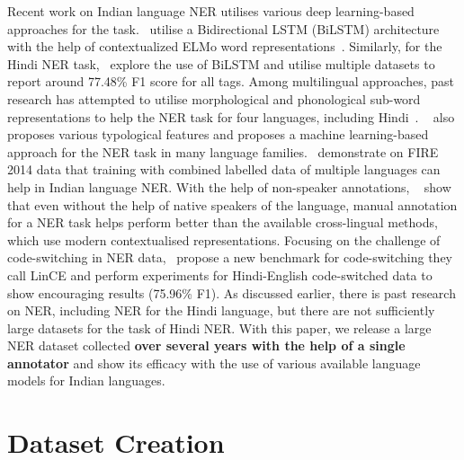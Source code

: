 \documentclass[10pt, a4paper]{article}
\begin{document}
Recent work on Indian language NER utilises various deep learning-based approaches for the task.~ utilise a Bidirectional LSTM (BiLSTM) architecture with the help of contextualized ELMo word representations~\cite{peters-etal-2018-deep}. Similarly, for the Hindi NER task,~ explore the use of BiLSTM and utilise multiple datasets to report around 77.48\% F1 score for all tags. Among multilingual approaches, past research has attempted to utilise morphological and phonological sub-word representations to help the NER task for four languages, including Hindi~\cite{chaudhary2018adapting}. ~ also proposes various typological features and proposes a machine learning-based approach for the NER task in many language families.~\cite{10.1145/3238797,murthy-etal-2018-judicious} demonstrate on FIRE 2014 data that training with combined labelled data of multiple languages can help in Indian language NER. With the help of non-speaker annotations, ~ show that even without the help of native speakers of the language, manual annotation for a NER task helps perform better than the available cross-lingual methods, which use modern contextualised representations. Focusing on the challenge of code-switching in NER data,~ propose a new benchmark for code-switching they call LinCE and perform experiments for Hindi-English code-switched data to show encouraging results (75.96\% F1). As discussed earlier, there is past research on NER, including NER for the Hindi language, but there are not sufficiently large datasets for the task of Hindi NER. With this paper, we release a large NER dataset collected \textbf{over several years with the help of a single annotator} and show its efficacy with the use of various available language models for Indian languages.


 \section{Dataset Creation}
\end{document}

